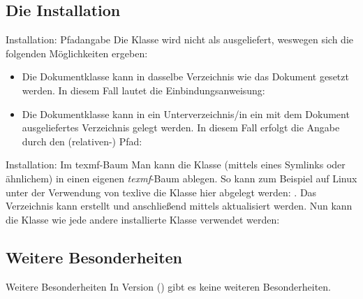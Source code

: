 \documentclass{sopra-seraphim}
\begin{document}
    \subsection{Die Installation}
    \begin{frame}[fragile]{Installation: Pfadangabe}
        Die Klasse wird nicht als  ausgeliefert, weswegen sich die
    folgenden Möglichkeiten ergeben:
\begin{itemize}
    \item Die Dokumentklasse kann in dasselbe Verzeichnis wie das Dokument
    gesetzt werden. In diesem Fall lautet die Einbindungsanweisung:
    \item Die Dokumentklasse kann in ein Unterverzeichnis/in ein mit
                dem Dokument ausgeliefertes Verzeichnis gelegt werden. In
                diesem Fall erfolgt die Angabe durch den (relativen-) Pfad:
\end{itemize}

    \end{frame}

    \begin{frame}[fragile]{Installation: Im texmf-Baum}
        Man kann die Klasse (mittels eines Symlinks oder ähnlichem)
        in einen eigenen \emph{texmf}-Baum ablegen.
        So kann zum Beispiel auf Linux unter der Verwendung von texlive
        die Klasse hier abgelegt werden: .
        Das Verzeichnis kann erstellt und anschließend mittels
         aktualisiert werden. Nun kann
        die Klasse wie jede andere installierte Klasse verwendet werden:
    \end{frame}

    \subsection{Weitere Besonderheiten}
    \begin{frame}[fragile]{Weitere Besonderheiten}
        In Version \thesosversion{} () gibt es keine weiteren Besonderheiten.
    \end{frame}
\end{document}
